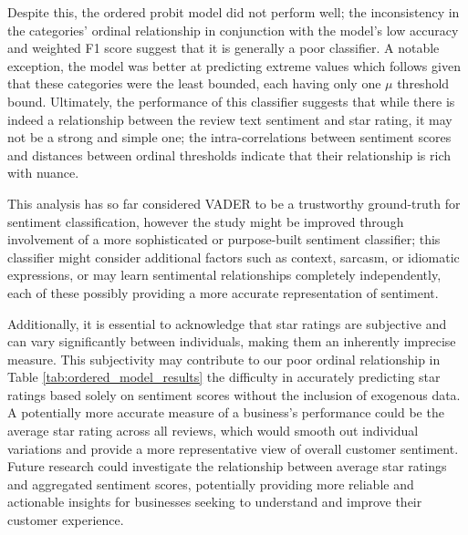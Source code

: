 \documentclass[sn-mathphys,Numbered]{sn-jnl}%
\theoremstyle{thmstyleone}%
\theoremstyle{thmstyletwo}%
\theoremstyle{thmstylethree}%
\begin{document}
Despite this, the ordered probit model did not perform well; the inconsistency in the categories' ordinal relationship in conjunction with the model's low accuracy and weighted F1 score suggest that it is generally a poor classifier. A notable exception, the model was better at predicting extreme values which follows given that these categories were the least bounded, each having only one $\mu$ threshold bound. Ultimately, the performance of this classifier suggests that while there is indeed a relationship between the review text sentiment and star rating, it may not be a strong and simple one; the intra-correlations between sentiment scores and distances between ordinal thresholds indicate that their relationship is rich with nuance.

This analysis has so far considered VADER to be a trustworthy ground-truth for sentiment classification, however the study might be  improved through involvement of a more sophisticated or purpose-built sentiment classifier; this classifier might consider additional factors such as context, sarcasm, or idiomatic expressions, or may learn sentimental relationships completely independently, each of these possibly providing a more accurate representation of sentiment.

Additionally, it is essential to acknowledge that star ratings are subjective and can vary significantly between individuals, making them an inherently imprecise measure. This subjectivity may contribute to our poor ordinal relationship in Table \ref{tab:ordered_model_results} the difficulty in accurately predicting star ratings based solely on sentiment scores without the inclusion of exogenous data. A potentially more accurate measure of a business's performance could be the average star rating across all reviews, which would smooth out individual variations and provide a more representative view of overall customer sentiment. Future research could investigate the relationship between average star ratings and aggregated sentiment scores, potentially providing more reliable and actionable insights for businesses seeking to understand and improve their customer experience.



\end{document}
